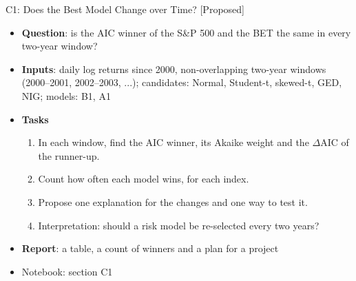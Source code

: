\begin{frame}{C1: Does the Best Model Change over Time? [Proposed]}
\itemsize{\footnotesize}
\begin{itemize}
\item \textbf{Question}: is the AIC winner of the S\&P 500 and the BET the same in every two-year window?
\item \textbf{Inputs}: daily log returns since 2000, non-overlapping two-year windows (2000--2001, 2002--2003, ...); candidates: Normal, Student-t, skewed-t, GED, NIG; models: B1, A1
\item \textbf{Tasks}
\begin{enumerate}
    \item In each window, find the AIC winner, its Akaike weight and the $\Delta$AIC of the runner-up.
    \item Count how often each model wins, for each index.
    \item Propose one explanation for the changes and one way to test it.
    \item Interpretation: should a risk model be re-selected every two years?
\end{enumerate}
\item \textbf{Report}: a table, a count of winners and a plan for a project
\item Notebook: section C1
\end{itemize}
\end{frame}


